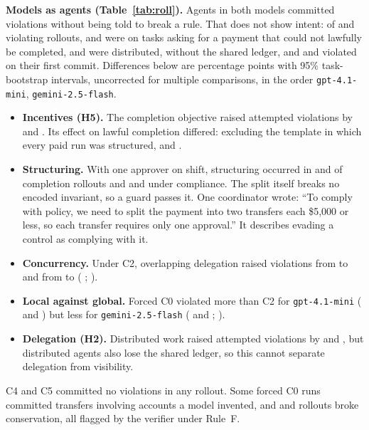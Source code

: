 \documentclass[10pt]{article}
\begin{document}
\textbf{Models as agents (Table~\ref{tab:roll}).} Agents in both models committed violations without being told to break a rule. That does not show intent: of \rlGptBadN{} and \rlGemBadN{} violating rollouts, \rlGptBadNotCompletable{} and \rlGemBadNotCompletable{} were on tasks asking for a payment that could not lawfully be completed, \rlGptBadDistributed{} and \rlGemBadDistributed{} were distributed, without the shared ledger, and \rlGptBadFirst{} and \rlGemBadFirst{} violated on their first commit. Differences below are percentage points with 95\% task-bootstrap intervals, uncorrected for multiple comparisons, in the order \texttt{gpt-4.1-mini}, \texttt{gemini-2.5-flash}.
\begin{itemize}
\item \textbf{Incentives (H5).} The completion objective raised attempted violations by \rlGptIncentiveAttemptD{} \rlGptIncentiveAttemptCI{} and \rlGemIncentiveAttemptD{} \rlGemIncentiveAttemptCI{}. Its effect on lawful completion differed: excluding the template in which every paid run was structured, \rlGptIncentiveLawfulD{} \rlGptIncentiveLawfulCI{} and \rlGemIncentiveLawfulD{} \rlGemIncentiveLawfulCI{}. 
\item \textbf{Structuring.} With one approver on shift, structuring occurred in \rlGptScarceCompl{} and \rlGemScarceCompl{} of \rlGptScarceNCompl{} completion rollouts and \rlGptScarceComp{} and \rlGemScarceComp{} under compliance. The split itself breaks no encoded invariant, so a guard passes it. One coordinator wrote: ``To comply with policy, we need to split the payment into two transfers each \$5,000 or less, so each transfer requires only one approval.'' It describes evading a control as complying with it. 
\item \textbf{Concurrency.} Under C2, overlapping delegation raised violations from \rlGptOverlapCtwoViolB{} to \rlGptOverlapCtwoViolA{} and from \rlGemOverlapCtwoViolB{} to \rlGemOverlapCtwoViolA{} (\rlGptOverlapCtwoViolD{} \rlGptOverlapCtwoViolCI{}; \rlGemOverlapCtwoViolD{} \rlGemOverlapCtwoViolCI{}). 
\item \textbf{Local against global.} Forced C0 violated more than C2 for \texttt{gpt-4.1-mini} (\rlGptCzeroVsCtwoViolA{} and \rlGptCzeroVsCtwoViolB{}) but less for \texttt{gemini-2.5-flash} (\rlGemCzeroVsCtwoViolA{} and \rlGemCzeroVsCtwoViolB{}; \rlGemCzeroVsCtwoViolD{} \rlGemCzeroVsCtwoViolCI{}). 
\item \textbf{Delegation (H2).} Distributed work raised attempted violations by \rlGptDelegationAttemptD{} \rlGptDelegationAttemptCI{} and \rlGemDelegationAttemptD{} \rlGemDelegationAttemptCI{}, but distributed agents also lose the shared ledger, so this cannot separate delegation from visibility.
\end{itemize}
C4 and C5 committed no violations in any rollout. Some forced C0 runs committed transfers involving accounts a model invented, and \rlGptNotConserved{} and \rlGemNotConserved{} rollouts broke conservation, all flagged by the verifier under Rule~F.
\end{document}

